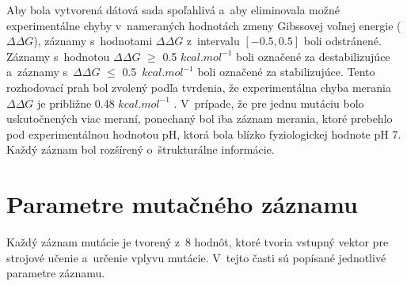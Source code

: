 Aby bola vytvorená dátová sada spoľahlivá a~aby eliminovala možné experimentálne chyby v~nameraných hodnotách zmeny Gibssovej voľnej energie ($\Delta\Delta G$), záznamy s~hodnotami $\Delta\Delta G$ z~intervalu $\left[-0.5,0.5\right]$ boli odstránené. Záznamy s~hodnotou $\Delta\Delta G$ $\geq$ 0.5 $kcal.mol^{-1}$ boli označené za destabilizujúce a~záznamy s~$\Delta\Delta G$ $\leq$ 0.5~$kcal.mol^{-1}$ boli označené za stabilizujúce. Tento rozhodovací prah bol zvolený podľa tvrdenia, že experimentálna chyba merania $\Delta\Delta G$ je približne 0.48 $kcal.mol^{-1}$ \cite{threshold}.
V~prípade, že pre jednu mutáciu bolo uskutočnených viac meraní, ponechaný bol iba záznam merania, ktoré prebehlo pod experimentálnou hodnotou pH, ktorá bola blízko fyziologickej hodnote pH 7. Každý záznam bol rozšírený o~štrukturálne informácie.

\section{Parametre mutačného záznamu}

Každý záznam mutácie je tvorený z~8 hodnôt, ktoré tvoria vstupný vektor pre strojové učenie a~určenie vplyvu mutácie. V~tejto časti sú popísané jednotlivé parametre záznamu.

